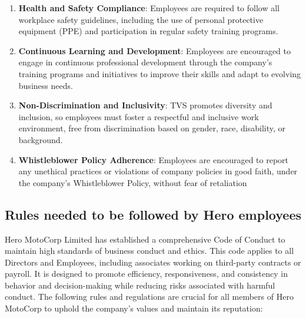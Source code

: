 \begin{enumerate}
	\item \textbf{Health and Safety Compliance}: Employees are required to follow all workplace safety guidelines, including the use of personal protective equipment (PPE) and participation in regular safety training programs.
	
	\item \textbf{Continuous Learning and Development}: Employees are encouraged to engage in continuous professional development through the company's training programs and initiatives to improve their skills and adapt to evolving business needs.
	
	\item \textbf{Non-Discrimination and Inclusivity}: TVS promotes diversity and inclusion, so employees must foster a respectful and inclusive work environment, free from discrimination based on gender, race, disability, or background.
	
	\item \textbf{Whistleblower Policy Adherence}: Employees are encouraged to report any unethical practices or violations of company policies in good faith, under the company's Whistleblower Policy, without fear of retaliation
\end{enumerate}

\subsection{Rules needed to be followed by Hero employees}

Hero MotoCorp Limited has established a comprehensive Code of Conduct \cite{hero-code-of-conduct} to maintain high standards of business conduct and ethics. This code applies to all Directors and Employees, including associates working on third-party contracts or payroll. It is designed to promote efficiency, responsiveness, and consistency in behavior and decision-making while reducing risks associated with harmful conduct. The following rules and regulations are crucial for all members of Hero MotoCorp to uphold the company's values and maintain its reputation:

